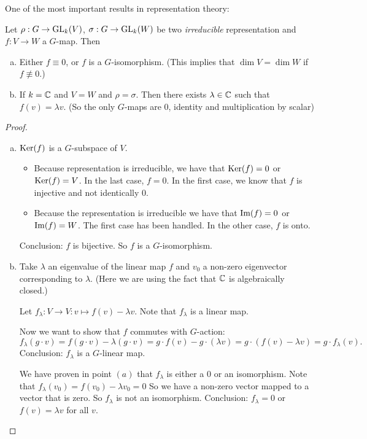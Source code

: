 One of the most important results in representation theory:

\begin{theorem}
    Let $\rho: G \to  \operatorname{GL}_k(V)$, $\sigma: G \to  \operatorname{GL}_k(W)$ be two \emph{irreducible} representation and $f: V \to  W$ a $G$-map. Then
    \begin{enumerate}[(a)]
        \item Either $f \equiv 0$, or $f$ is a $G$-isomorphism. (This implies that $\dim V  = \dim W$ if  $f \not\equiv 0$.)
        \item If $k = \mathbb{C}$ and $V = W$ and  $\rho = \sigma$.
            Then there exists $\lambda \in \mathbb{C}$ such that $f(v) = \lambda v$.
            (So the only $G$-maps are $0$, identity and multiplication by scalar)
    \end{enumerate}
\end{theorem}

\begin{proof}
    \begin{enumerate}[(a)]
        \item $\operatorname{Ker}(f)$ is a  $G$-subspace of $V$.
            \begin{itemize}
                \item Because representation is irreducible, we have that $\operatorname{Ker}(f) = 0$ or  $\operatorname{Ker} (f) = V$.
                    In the last case,  $f = 0$.
                    In the first case,  we know that $f$ is injective and not identically $0$.
                \item Because the representation is irreducible we have that $\operatorname{Im}(f) = 0$ or  $\operatorname{Im}(f) = W$. The first case has been handled.
                    In the other case, $f$ is onto.
            \end{itemize}
            Conclusion: $f$ is bijective. So  $f$ is a $G$-isomorphism.
        \item Take $\lambda$ an eigenvalue of the linear map $f$ and $v_0$ a non-zero eigenvector corresponding to $\lambda$. (Here we are using the fact that $\mathbb{C}$ is algebraically closed.) 

            Let  $f_\lambda: V \to  V: v \mapsto  f(v) - \lambda v$.
            Note that $f_\lambda$ is a linear map.

            Now we want to show that  $f$ commutes with $G$-action:
            \[
                f_\lambda ( g\cdot v ) = f(g\cdot v) - \lambda (g\cdot v)
                = g \cdot f(v)  - g\cdot (\lambda v) = g\cdot (f(v) - \lambda v) = g\cdot f_\lambda(v)
            .\] 
            Conclusion: $f_\lambda$ is a  $G$-linear map.

            We have proven in point $(a)$ that $f_\lambda$ is either a $0$ or an isomorphism.
            Note that $f_\lambda(v_0)  = f(v_0) - \lambda v_0 = 0$
            So we have a non-zero vector mapped to a vector that is zero.
            So $f_\lambda$ is not an isomorphism. Conclusion:  $f_\lambda = 0$
            or $f(v) = \lambda v$ for all  $v$.
    \end{enumerate}
\end{proof}

